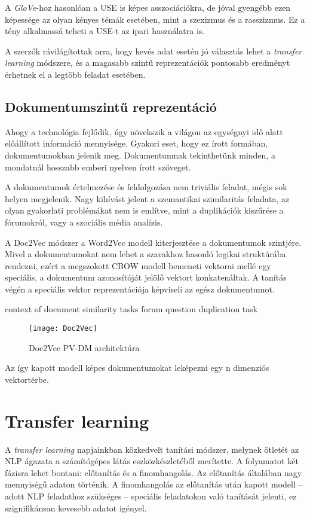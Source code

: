 A \textit{GloVe}-hoz hasonlóan a USE is képes asszociációkra, de jóval gyengébb ezen képessége az olyan kényes témák esetében, mint a szexizmus és a rasszizmus. Ez a tény alkalmassá teheti a USE-t az ipari használatra is.

A szerzők rávilágítottak arra, hogy kevés adat esetén jó választás lehet a \textit{transfer learning} módszere, és a magasabb szintű reprezentációk pontosabb eredményt érhetnek el a legtöbb feladat esetében.

\subsection{Dokumentumszintű reprezentáció}
Ahogy a technológia fejlődik, úgy növekszik a világon az egységnyi idő alatt előállított információ mennyisége. Gyakori eset, hogy ez írott formában, dokumentumokban jelenik meg. Dokumentumnak tekinthetünk minden, a mondatnál hosszabb emberi nyelven írott szöveget.

A dokumentumok értelmezése és feldolgozása nem triviális feladat, mégis sok helyen megjelenik. Nagy kihívást jelent a szemantikai szimilaritás feladata, az olyan gyakorlati problémákat nem is említve, mint a duplikációk kiszűrése a fórumokról, vagy a szociális média analízis.

A Doc2Vec módszer a Word2Vec modell kiterjesztése a dokumentumok szintjére. Mivel a dokumentumokat nem lehet a szavakhoz hasonló logikai struktúrába rendezni, ezért a megszokott CBOW modell bemeneti vektorai mellé egy speciális, a dokumentum azonosítóját jelölő vektort konkatenáltak. A tanítás végén a speciális vektor reprezentációja képviseli az egész dokumentumot.


context of document similarity tasks 
forum question duplication task

\begin{figure}[H]
	\centering
	\texttt{[image: Doc2Vec]}
	\caption{Doc2Vec PV-DM architektúra}
\end{figure}

Az így kapott modell képes dokumentumokat leképezni egy n dimenziós vektortérbe.

\section{Transfer learning}

A \textit{transfer learning} napjainkban közkedvelt tanítási módszer, melynek ötletét az NLP ágazata a számítógépes látás eszközkészletéből merítette. A folyamatot két fázisra lehet bontani: előtanítás és a finomhangolás. Az előtanítás általában nagy mennyiségű adaton történik. A finomhangolás az előtanítás után kapott modell – adott NLP feladathoz szükséges – speciális feladatokon való tanítását jelenti, ez szignifikánsan kevesebb adatot igényel.

